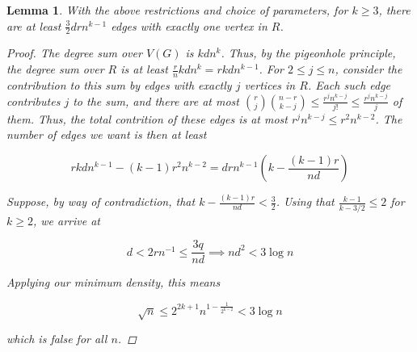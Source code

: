 \documentclass[12pt]{article}
\newtheorem{lemma}[thm]{Lemma}
\begin{document}
    \begin{lemma}
        With the above restrictions and choice of parameters, \color{red} for $k \geq 3$, \color{black}
        there are at least $\frac{3}{2}drn^{k-1}$
        edges with exactly one vertex in $R$.

        \begin{proof}

            The degree sum over $V(G)$ is $kdn^{k}$.
            Thus, by the pigeonhole principle, the degree sum over $R$ is at least
            $\frac{r}{n}kdn^{k} = rkdn^{k-1}$.
            For $2 \leq j \leq n$, consider the contribution to this sum by edges with exactly $j$ vertices in $R$.
            Each such edge contributes $j$ to the sum, and there are at most
            $\binom{r}{j}\binom{n-r}{k-j} \leq \frac{r^j n^{k-j}}{j!} \leq \frac{r^j n^{k-j}}{j}$ of them.
            Thus, the total contrition of these edges is at most $r^j n^{k-j} \leq r^{2}n^{k-2}$.
            The number of edges we want is then at least

            \[
                rkdn^{k-1} - (k-1)r^{2}n^{k-2} = drn^{k-1} \left( k - \frac{(k-1)r}{nd}\right)
            \]
            
            Suppose, by way of contradiction,
            that $ k - \frac{(k-1)r}{nd} < \frac{3}{2}$.
            Using that $\frac{k-1}{k-3/2} \leq 2$
            for $k \geq 2$, we arrive at

            \[
                d < 2rn^{-1} \leq \frac{3q}{nd} \implies nd^2 < 3 \log n
            \]
            
            Applying our minimum density, this means
            
            \[
                \sqrt {n} \leq 2^{2k+1} n^{1 - \frac{1}{2^{k-2}}} < 3 \log n
            \]

            which is false for all $n$.
        \end{proof}
    \end{lemma}
\end{document}
